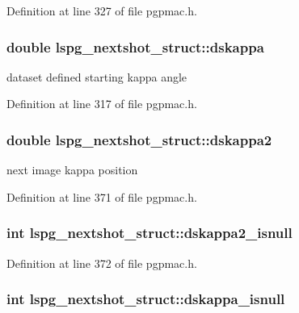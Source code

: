 Definition at line 327 of file pgpmac.\-h.

\hypertarget{structlspg__nextshot__struct_a59355281e8eb935cd7bfac597fdc5289}{
\subsubsection[{dskappa}]{\setlength{\rightskip}{0pt plus 5cm}double lspg\-\_\-nextshot\-\_\-struct\-::dskappa}}\label{structlspg__nextshot__struct_a59355281e8eb935cd7bfac597fdc5289}


dataset defined starting kappa angle 



Definition at line 317 of file pgpmac.\-h.

\hypertarget{structlspg__nextshot__struct_a8571a0b95fb6ea6356fd7204b9c9e371}{
\subsubsection[{dskappa2}]{\setlength{\rightskip}{0pt plus 5cm}double lspg\-\_\-nextshot\-\_\-struct\-::dskappa2}}\label{structlspg__nextshot__struct_a8571a0b95fb6ea6356fd7204b9c9e371}


next image kappa position 



Definition at line 371 of file pgpmac.\-h.

\hypertarget{structlspg__nextshot__struct_a9a7e47372f4f6e0e48a0cb3c78fa8437}{
\subsubsection[{dskappa2\-\_\-isnull}]{\setlength{\rightskip}{0pt plus 5cm}int lspg\-\_\-nextshot\-\_\-struct\-::dskappa2\-\_\-isnull}}\label{structlspg__nextshot__struct_a9a7e47372f4f6e0e48a0cb3c78fa8437}


Definition at line 372 of file pgpmac.\-h.

\hypertarget{structlspg__nextshot__struct_a1686a72509cc1c3383ee95a790ddff14}{
\subsubsection[{dskappa\-\_\-isnull}]{\setlength{\rightskip}{0pt plus 5cm}int lspg\-\_\-nextshot\-\_\-struct\-::dskappa\-\_\-isnull}}\label{structlspg__nextshot__struct_a1686a72509cc1c3383ee95a790ddff14}



